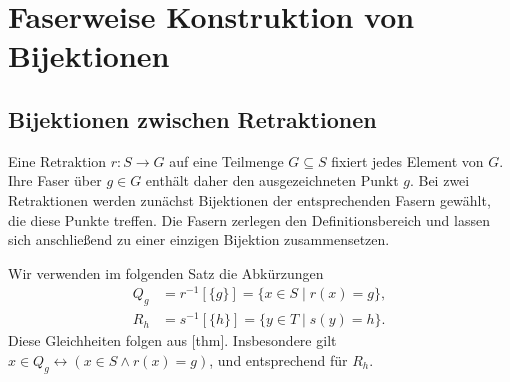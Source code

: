 \documentclass[main.tex]{subfiles}
\begin{document}
\begin{tabproof}




\end{tabproof}






\chapter{Faserweise Konstruktion von Bijektionen}

\ProofWideReasonsNearFormula

\section{Bijektionen zwischen Retraktionen}

Eine Retraktion \(r\colon S\to G\) auf eine Teilmenge \(G\subseteq S\)
fixiert jedes Element von \(G\). Ihre Faser über \(g\in G\) enthält daher
den ausgezeichneten Punkt \(g\). Bei zwei Retraktionen werden zunächst
Bijektionen der entsprechenden Fasern gewählt, die diese Punkte treffen.
Die Fasern zerlegen den Definitionsbereich und lassen sich anschließend
zu einer einzigen Bijektion zusammensetzen.

Wir verwenden im folgenden Satz die Abkürzungen
\[
  \begin{aligned}
    Q_g&=r^{-1}[\{g\}]=\{x\in S\mid r(x)=g\},\\[-2pt]
    R_h&=s^{-1}[\{h\}]=\{y\in T\mid s(y)=h\}.
  \end{aligned}
\]
Diese Gleichheiten folgen aus
[thm]. Insbesondere gilt
\(x\in Q_g\leftrightarrow(x\in S\land r(x)=g)\), und entsprechend für
\(R_h\).
\end{document}
